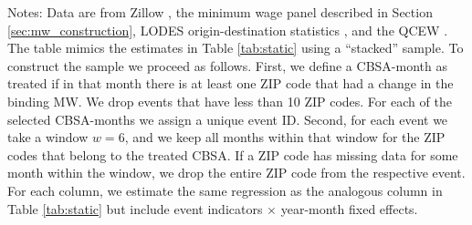\begin{table}[hbt!]
    \begin{minipage}{.95\textwidth} \footnotesize
        \vspace{2mm}
        Notes: 
        Data are from Zillow \parencite{ZillowData}, 
        the minimum wage panel described in Section \ref{sec:mw_construction}, 
        LODES origin-destination statistics \parencite{CensusLODES},
        and the QCEW \parencite{QCEW}.
        The table mimics the estimates in Table \ref{tab:static} using a 
        ``stacked'' sample.
        To construct the sample we proceed as follows.
        First, we define a CBSA-month as treated if in that month there is at 
        least one ZIP code that had a change in the binding MW.
        We drop events that have less than 10 ZIP codes.
        For each of the selected CBSA-months we assign a unique event ID. 
        Second, for each event we take a window $w = 6$, and we keep all months 
        within that window for the ZIP codes that belong to the treated CBSA.
        If a ZIP code has missing data for some month within the window, we drop 
        the entire ZIP code from the respective event.
        For each column, we estimate the same regression as the analogous column 
        in Table \ref{tab:static} but include event indicators $\times$ year-month
        fixed effects.
    \end{minipage}
\end{table}
